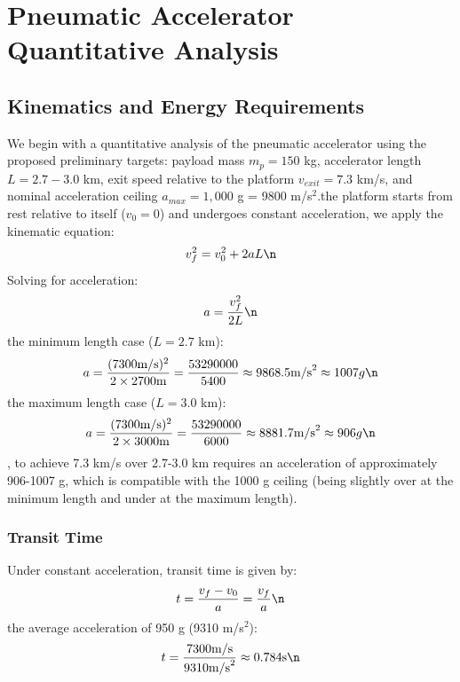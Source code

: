 \documentclass{article}
\begin{document}
\newtheorem{theorem}{Theorem}
\section{Pneumatic Accelerator Quantitative Analysis}
\label{sec:pneumatic}

\subsection{Kinematics and Energy Requirements}
We begin with a quantitative analysis of the pneumatic accelerator using the proposed preliminary targets: payload mass $m_p = 150$ kg, accelerator length $L = 2.7-3.0$ km, exit speed relative to the platform $v_{exit} = 7.3$ km/s, and nominal acceleration ceiling $a_{max} = 1,000$ g = 9800 m/s$^2$.\n\nAssuming the platform starts from rest relative to itself ($v_0 = 0$) and undergoes constant acceleration, we apply the kinematic equation:\n\begin{equation}
v_f^2 = v_0^2 + 2aL\n\end{equation}
Solving for acceleration:\n\begin{equation}
 a = \frac{v_f^2}{2L}\n\end{equation}
\nFor the minimum length case ($L = 2.7$ km):\n\begin{equation}
 a = \frac{(7300 \text{m/s})^2}{2 \times 2700 \text{m}} = \frac{53290000}{5400} \approx 9868.5 \text{m/s}^2 \approx 1007  g\n\end{equation}
\nFor the maximum length case ($L = 3.0$ km):\n\begin{equation}
 a = \frac{(7300 \text{m/s})^2}{2 \times 3000 \text{m}} = \frac{53290000}{6000} \approx 8881.7 \text{m/s}^2 \approx 906  g\n\end{equation}
\nThus, to achieve 7.3 km/s over 2.7-3.0 km requires an acceleration of approximately 906-1007 g, which is compatible with the 1000 g ceiling (being slightly over at the minimum length and under at the maximum length).\n\n\subsubsection{Transit Time}
Under constant acceleration, transit time is given by:\n\begin{equation}
 t = \frac{v_f - v_0}{a} = \frac{v_f}{a}\n\end{equation}
\nUsing the average acceleration of 950 g (9310 m/s$^2$):\n\begin{equation}
 t = \frac{7300 \text{m/s}}{9310 \text{m/s}^2} \approx 0.784  \text{s}\n\end{equation}
\end{document}
